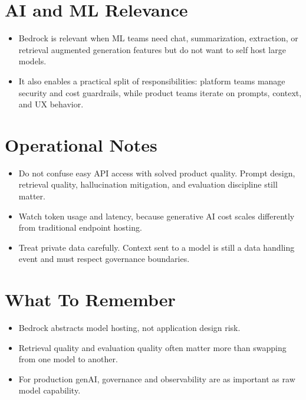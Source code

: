 \documentclass[10pt,twocolumn]{article}
\begin{document}
\section*{AI and ML Relevance}
\begin{itemize}
\item Bedrock is relevant when ML teams need chat, summarization, extraction, or retrieval augmented generation features but do not want to self host large models.
\item It also enables a practical split of responsibilities: platform teams manage security and cost guardrails, while product teams iterate on prompts, context, and UX behavior.
\end{itemize}

\section*{Operational Notes}
\begin{itemize}
\item Do not confuse easy API access with solved product quality. Prompt design, retrieval quality, hallucination mitigation, and evaluation discipline still matter.
\item Watch token usage and latency, because generative AI cost scales differently from traditional endpoint hosting.
\item Treat private data carefully. Context sent to a model is still a data handling event and must respect governance boundaries.
\end{itemize}

\section*{What To Remember}
\begin{itemize}
\item Bedrock abstracts model hosting, not application design risk.
\item Retrieval quality and evaluation quality often matter more than swapping from one model to another.
\item For production genAI, governance and observability are as important as raw model capability.
\end{itemize}
\end{document}
